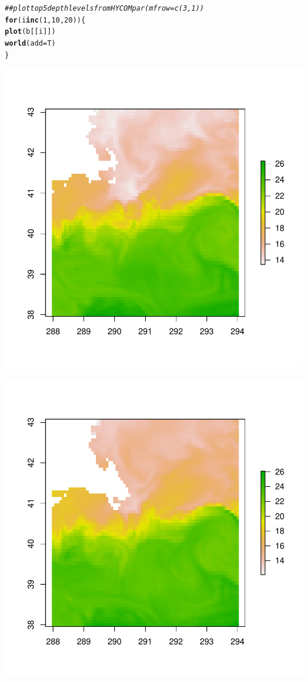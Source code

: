 \documentclass{article}\usepackage[]{graphicx}\usepackage[]{color}
\makeatletter
\def\maxwidth{ %
  \ifdim\Gin@nat@width>\linewidth
    \linewidth
  \else
    \Gin@nat@width
  \fi
}
\newcommand{\hlnum}[1]{\textcolor[rgb]{0.686,0.059,0.569}{#1}}%
\newcommand{\hlcom}[1]{\textcolor[rgb]{0.678,0.584,0.686}{\textit{#1}}}%
\newcommand{\hlstd}[1]{\textcolor[rgb]{0.345,0.345,0.345}{#1}}%
\newcommand{\hlkwa}[1]{\textcolor[rgb]{0.161,0.373,0.58}{\textbf{#1}}}%
\newcommand{\hlkwc}[1]{\textcolor[rgb]{0.333,0.667,0.333}{#1}}%
\newcommand{\hlkwd}[1]{\textcolor[rgb]{0.737,0.353,0.396}{\textbf{#1}}}%
\newenvironment{kframe}{%
 \def\at@end@of@kframe{}%
 \ifinner\ifhmode%
  \def\at@end@of@kframe{\end{minipage}}%
  \begin{minipage}{\columnwidth}%
 \fi\fi%
 \def\FrameCommand##1{\hskip\@totalleftmargin \hskip-\fboxsep
 \colorbox{shadecolor}{##1}\hskip-\fboxsep
     \hskip-\linewidth \hskip-\@totalleftmargin \hskip\columnwidth}%
 \MakeFramed {\advance\hsize-\width
   \@totalleftmargin\z@ \linewidth\hsize
   \@setminipage}}%
 {\par\unskip\endMakeFramed%
 \at@end@of@kframe}
\newenvironment{knitrout}{}{} %
\makeatother
\begin{document}
\begin{knitrout}
\begin{kframe}
{\ttfamily\noindent\itshape\color{messagecolor}{Loading required namespace: ncdf4}}\begin{alltt}
\hlcom{## plot top 5 depth levels from HYCOM par(mfrow=c(3,1))}
\hlkwa{for} \hlstd{(i} \hlkwa{in} \hlkwd{c}\hlstd{(}\hlnum{1}\hlstd{,} \hlnum{10}\hlstd{,} \hlnum{20}\hlstd{)) \{}
    \hlkwd{plot}\hlstd{(b[[i]])}
    \hlkwd{world}\hlstd{(}\hlkwc{add} \hlstd{= T)}
\hlstd{\}}
\end{alltt}
\end{kframe}
\includegraphics[width=\maxwidth]{figure/env-hycom-1} 

\includegraphics[width=\maxwidth]{figure/env-hycom-2} 


\end{knitrout}
\end{document}
